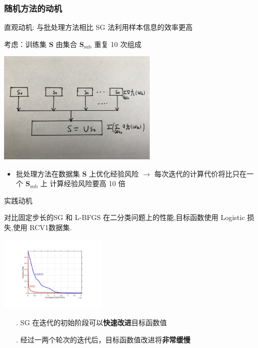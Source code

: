 \documentclass[handout]{beamer}
\begin{document}
\begin{frame}[allowframebreaks]
\frametitle{随机方法的动机}

{\color{dblue}直观动机}: 与批处理方法相比 SG 法利用样本信息的效率更高


考虑：训练集 $\mathbf{S}$ 由集合 $\mathbf{S}_{\mathrm{sub}}$ 重复 10 次组成


\begin{center}{
\includegraphics[width=3in]{./figure/FG.pdf}}
\end{center}


\begin{itemize}
  \item 批处理方法在数据集 $\mathbf{S}$ 上优化经验风险 $\rightarrow$ 每次迭代的计算代价将比只在一个 $\mathbf{S}_{\mathrm{sub}}$ 上 计算经验风险要高 10 倍
\end{itemize}

\framebreak

{\color{dblue}实践动机}

对比固定步长的SG 和 L-BFGS 在二分类问题上的性能,目标函数使用 Logistic 损失,使用 RCV1数据集. 
\begin{center}{
\includegraphics[width=2in]{./figure/SGD-BFGS.pdf}}
\end{center}

\begin{itemize}
  \item[.] SG 在迭代的初始阶段可以\textbf{快速改进}目标函数值
  \item[.] 经过一两个轮次的迭代后，目标函数值改进将\textbf{非常缓慢}
\end{itemize}


\end{frame}
\end{document}
